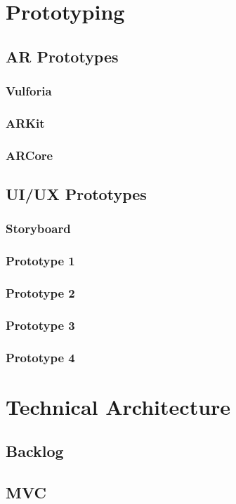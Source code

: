 \section{Prototyping}
\subsection{AR Prototypes}
\subsubsection{Vulforia}
\subsubsection{ARKit}
\subsubsection{ARCore}

\subsection{UI/UX Prototypes}
\subsubsection{Storyboard}
\subsubsection{Prototype 1}
\subsubsection{Prototype 2}
\subsubsection{Prototype 3}
\subsubsection{Prototype 4}

\section{Technical Architecture}
\subsection{Backlog}
\subsection{MVC}